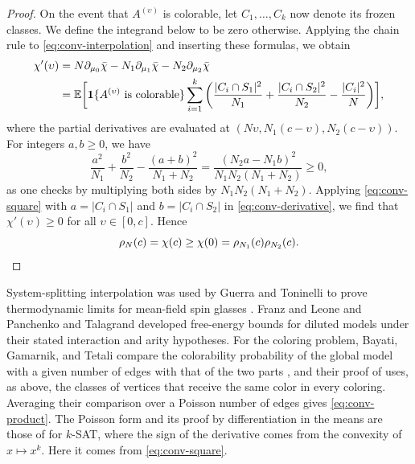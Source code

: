 \begin{proof}
On the event that $A^{(\upsilon)}$ is colorable, let $C_1, \dots, C_k$ now denote its frozen classes. We define the integrand below to be zero otherwise. Applying the chain rule to \eqref{eq:conv-interpolation} and inserting these formulas, we obtain
\begin{equation}\label{eq:conv-derivative}
\begin{aligned}
\chi'(\upsilon) &= N \partial_{\mu_0} \bar\chi - N_1 \partial_{\mu_1} \bar\chi - N_2 \partial_{\mu_2} \bar\chi\\
&= \mathbb E\bigg[\mathbf 1\{A^{(\upsilon)} \text{ is colorable}\} \sum_{i = 1}^k \bigg(\frac{|C_i \cap S_1|^2}{N_1} + \frac{|C_i \cap S_2|^2}{N_2} - \frac{|C_i|^2}{N}\bigg)\bigg],
\end{aligned}
\end{equation}
where the partial derivatives are evaluated at $(N\upsilon, N_1 (c - \upsilon), N_2 (c - \upsilon))$. For integers $a, b \ge 0$, we have
\begin{equation}\label{eq:conv-square}
\frac{a^2}{N_1} + \frac{b^2}{N_2} - \frac{(a + b)^2}{N_1 + N_2} = \frac{(N_2 a - N_1 b)^2}{N_1 N_2 (N_1 + N_2)} \ge 0,
\end{equation}
as one checks by multiplying both sides by $N_1 N_2 (N_1 + N_2)$. Applying \eqref{eq:conv-square} with $a = |C_i \cap S_1|$ and $b = |C_i \cap S_2|$ in \eqref{eq:conv-derivative}, we find that $\chi'(\upsilon) \ge 0$ for all $\upsilon \in [0, c]$. Hence
\[
\rho_N(c) = \chi(c) \ge \chi(0) = \rho_{N_1}(c) \rho_{N_2}(c). \qedhere
\]
\end{proof}

System-splitting interpolation was used by Guerra and Toninelli to prove thermodynamic limits for mean-field spin glasses \cite[Section~3, Theorems~1--2]{guerra2002thermodynamic}. Franz and Leone \cite[Section~III and appendices]{franz2003replicaa} and Panchenko and Talagrand \cite[Sections~1--2]{panchenko2004bounds} developed free-energy bounds for diluted models under their stated interaction and arity hypotheses. For the coloring problem, Bayati, Gamarnik, and Tetali compare the colorability probability of the global model with a given number of edges with that of the two parts \cite[Theorem~5]{bayati2013combinatorial}, and their proof of \cite[Proposition~2]{bayati2013combinatorial} uses, as above, the classes of vertices that receive the same color in every coloring. Averaging their comparison over a Poisson number of edges gives \eqref{eq:conv-product}. The Poisson form and its proof by differentiation in the means are those of \cite[Lemma~5.2]{openai2026limiting} for $k$-SAT, where the sign of the derivative comes from the convexity of $x \mapsto x^k$. Here it comes from \eqref{eq:conv-square}.


